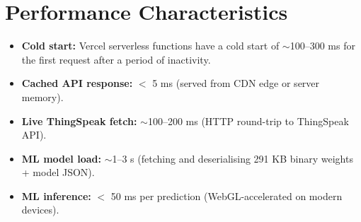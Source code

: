 \section{Performance Characteristics}

\begin{itemize}[leftmargin=1.5em]
  \item \textbf{Cold start:} Vercel serverless functions have a cold start of $\sim$100--300 ms for the first request after a period of inactivity.
  \item \textbf{Cached API response:} $<$ 5 ms (served from CDN edge or server memory).
  \item \textbf{Live ThingSpeak fetch:} $\sim$100--200 ms (HTTP round-trip to ThingSpeak API).
  \item \textbf{ML model load:} $\sim$1--3 s (fetching and deserialising 291 KB binary weights + model JSON).
  \item \textbf{ML inference:} $<$ 50 ms per prediction (WebGL-accelerated on modern devices).
\end{itemize}
